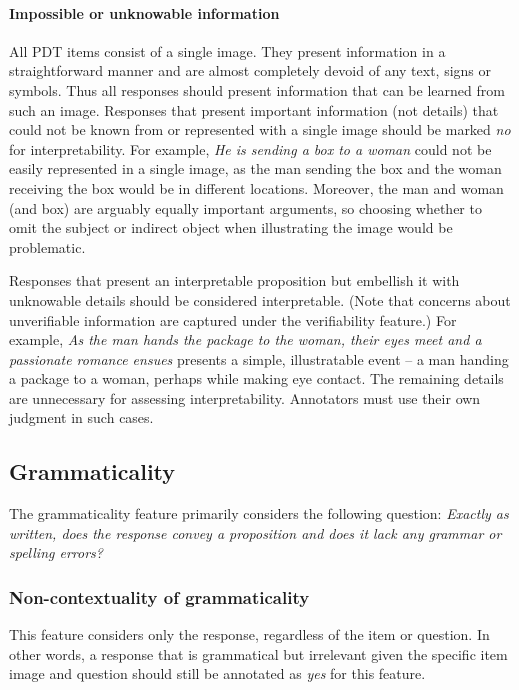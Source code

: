 \documentclass[12pt,notitlepage]{article}
\begin{document}
\paragraph{Impossible or unknowable information} All PDT items consist of a single image. They present information in a straightforward manner and are almost completely devoid of any text, signs or symbols. Thus all responses should present information that can be learned from such an image. Responses that present important information (not details) that could not be known from or represented with a single image should be marked \textit{no} for interpretability. For example, \textit{He is sending a box to a woman} could not be easily represented in a single image, as the man sending the box and the woman receiving the box would be in different locations. Moreover, the man and woman (and box) are arguably equally important arguments, so choosing whether to omit the subject or indirect object when illustrating the image would be problematic.

Responses that present an interpretable proposition but embellish it with unknowable details should be considered interpretable. (Note that concerns about unverifiable information are captured under the verifiability feature.) For example, \textit{As the man hands the package to the woman, their eyes meet and a passionate romance ensues} presents a simple, illustratable event -- a man handing a package to a woman, perhaps while making eye contact. The remaining details are unnecessary for assessing interpretability. Annotators must use their own judgment in such cases.


\subsection{Grammaticality} \label{subsec:grammaticality}
The grammaticality feature primarily considers the following question: \textit{Exactly as written, does the response convey a proposition and does it lack any grammar or spelling errors?}

\subsubsection{Non-contextuality of grammaticality} This feature considers only the response, regardless of the item or question. In other words, a response that is grammatical but  irrelevant given the specific item image and question should still be annotated as \textit{yes} for this feature.
\end{document}
